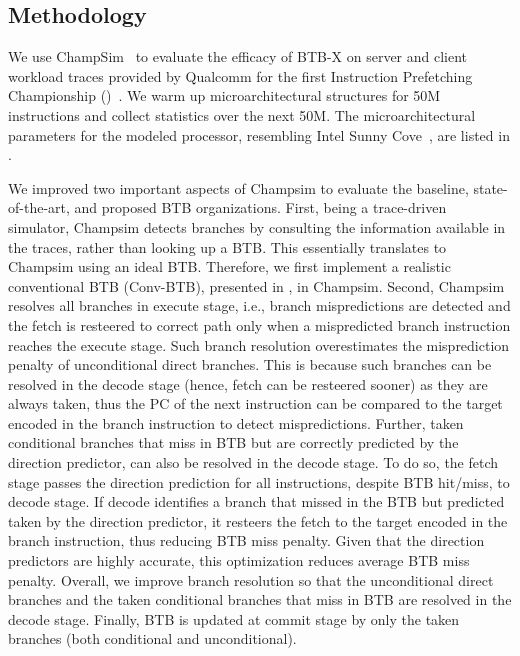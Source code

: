 
\subsection{Methodology}
We use ChampSim~\cite{champsim} to evaluate the efficacy of BTB-X on server and client workload traces provided by Qualcomm for the first Instruction Prefetching Championship ()~\cite{ipc1}. We warm up microarchitectural structures for 50M instructions and collect statistics over the next 50M. The microarchitectural parameters for the modeled processor, resembling Intel Sunny Cove~\cite{sunnycove}, are listed in .

We improved two important aspects of Champsim to evaluate the baseline, state-of-the-art, and proposed BTB organizations. First, being a trace-driven simulator, Champsim detects branches by consulting the information available in the traces, rather than looking up a BTB. This essentially translates to Champsim using an ideal BTB. Therefore, we first implement a realistic conventional BTB (Conv-BTB), presented in , in Champsim. Second, Champsim resolves all branches in execute stage, i.e., branch mispredictions are detected and the fetch is resteered to correct path only when a mispredicted branch instruction reaches the execute stage. Such branch resolution overestimates the misprediction penalty of unconditional direct branches. This is because such branches can be resolved in the decode stage (hence, fetch can be resteered sooner) as they are always taken, thus the PC of the next instruction can be compared to the target encoded in the branch instruction to detect mispredictions. Further, taken conditional branches that miss in BTB but are correctly predicted by the direction predictor, can also be resolved in the decode stage. To do so, the fetch stage passes the direction prediction for all instructions, despite BTB hit/miss, to decode stage. If decode identifies a branch that missed in the BTB but predicted taken by the direction predictor, it resteers the fetch to the target encoded in the branch instruction, thus reducing BTB miss penalty. Given that the direction predictors are highly accurate, this optimization reduces average BTB miss penalty. Overall, we improve branch resolution so that the unconditional direct branches and the taken conditional branches that miss in BTB are resolved in the decode stage. Finally, BTB is updated at commit stage by only the taken branches (both conditional and unconditional).

